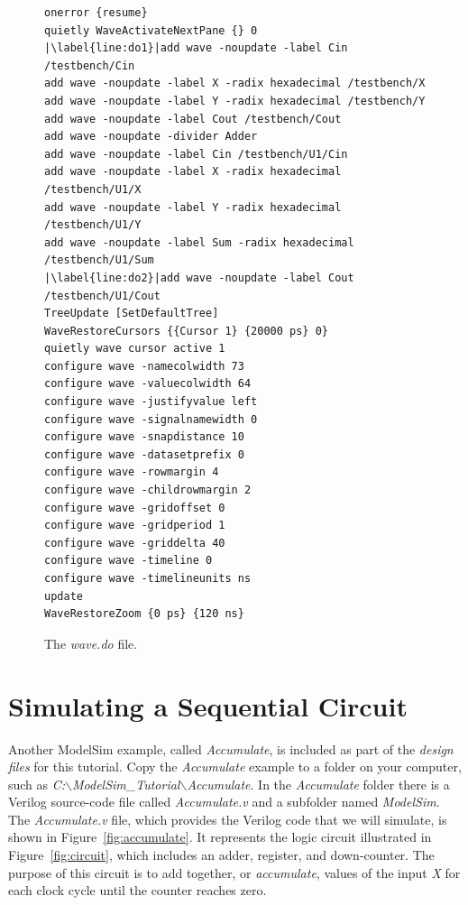 \documentclass[11pt, twoside, pdftex]{article}
\begin{document}
\lstset{numbers=left,escapechar=|}
\begin{figure}[h]
\begin{center}
\begin{minipage}[t]{14.5 cm}
\begin{lstlisting}[name=do]
onerror {resume}
quietly WaveActivateNextPane {} 0
|\label{line:do1}|add wave -noupdate -label Cin /testbench/Cin
add wave -noupdate -label X -radix hexadecimal /testbench/X
add wave -noupdate -label Y -radix hexadecimal /testbench/Y
add wave -noupdate -label Cout /testbench/Cout
add wave -noupdate -divider Adder
add wave -noupdate -label Cin /testbench/U1/Cin
add wave -noupdate -label X -radix hexadecimal /testbench/U1/X
add wave -noupdate -label Y -radix hexadecimal /testbench/U1/Y
add wave -noupdate -label Sum -radix hexadecimal /testbench/U1/Sum
|\label{line:do2}|add wave -noupdate -label Cout /testbench/U1/Cout
TreeUpdate [SetDefaultTree]
WaveRestoreCursors {{Cursor 1} {20000 ps} 0}
quietly wave cursor active 1
configure wave -namecolwidth 73
configure wave -valuecolwidth 64
configure wave -justifyvalue left
configure wave -signalnamewidth 0
configure wave -snapdistance 10
configure wave -datasetprefix 0
configure wave -rowmargin 4
configure wave -childrowmargin 2
configure wave -gridoffset 0
configure wave -gridperiod 1
configure wave -griddelta 40
configure wave -timeline 0
configure wave -timelineunits ns
update
WaveRestoreZoom {0 ps} {120 ns}
\end{lstlisting}
\end{minipage}
\caption{The {\it wave.do} file.}
\label{fig:do}
\end{center}
\end{figure}

\section{Simulating a Sequential Circuit}

Another ModelSim example, called {\it Accumulate}, is included as part of the
{\it design files} for this tutorial. Copy the {\it Accumulate} example to 
a folder on your computer, such as 
{\it C:$\backslash$ModelSim\_Tutorial$\backslash$Accumulate}. In the {\it Accumulate} folder
there is a Verilog source-code file called {\it Accumulate.v} and a subfolder named 
{\it ModelSim}. The {\it Accumulate.v} file, which provides the Verilog code that we will 
simulate, is shown in Figure~\ref{fig:accumulate}. It
represents the logic circuit illustrated in Figure~\ref{fig:circuit}, which includes an
adder, register, and down-counter. The purpose of this circuit is to add together, or
{\it accumulate}, values of the input {\it X} for each clock cycle until the counter 
reaches zero.
\end{document}

